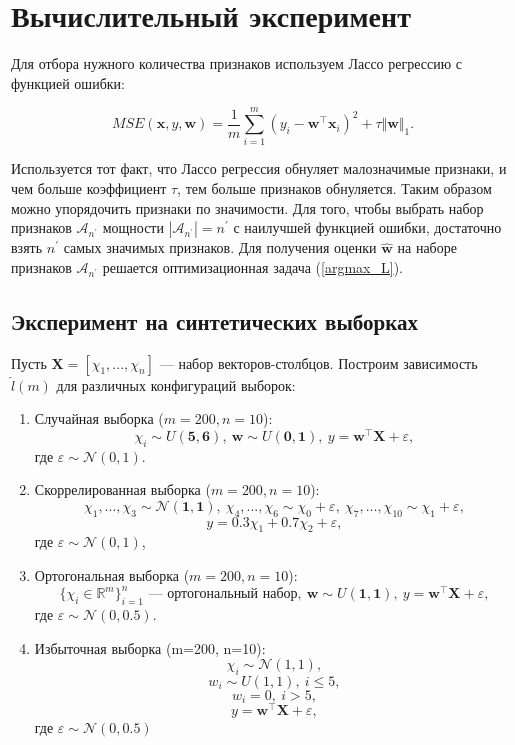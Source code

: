 \documentclass[12pt, a4paper]{scrartcl}
\theoremstyle{plain}
\theoremstyle{definition}
\begin{document}
\newpage
\section{Вычислительный эксперимент}

Для отбора нужного количества признаков используем Лассо регрессию с функцией ошибки:

\begin{equation}\label{MSE_lasso}
MSE(\mathbf{x}, y, \textbf{w}) = \frac{1}{m}\sum\limits_{i=1}^{m}(y_i - \textbf{w}^{\top}\mathbf{x}_i )^2 + \tau \Vert \mathbf{w}\Vert_1.
\end{equation}

Используется тот факт, что Лассо регрессия обнуляет малозначимые признаки, и чем больше коэффициент $\tau$, тем больше признаков обнуляется. Таким образом можно упорядочить признаки по значимости. Для того, чтобы выбрать набор признаков $\mathcal{A}_{n^{\prime}}$ мощности $|\mathcal{A}_{n^{\prime}}| = n^{\prime}$ с наилучшей функцией ошибки, достаточно взять $n^{\prime}$ самых значимых признаков.  Для получения оценки $\hat{\mathbf{w}}$ на наборе признаков $\mathcal{A}_{n^{\prime}}$ решается оптимизационная задача (\ref{argmax_L}).

\subsection{Эксперимент на синтетических выборках}

Пусть $\mathbf{X} = [\chi_1, ..., \chi_n]$ --- набор векторов-столбцов. Построим зависимость $\hat{l}(m)$ для различных конфигураций выборок:

\begin{enumerate}
	\item Случайная выборка ($m = 200, n = 10$): 
$$ 
\chi_i \sim U(\mathbf{5}, \mathbf{6}), ~ \mathbf{w} \sim U(\mathbf{0}, \mathbf{1}), ~ y = \mathbf{w}^{\top}\mathbf{X} + \varepsilon,
$$
где $\varepsilon \sim \mathcal{N}(0, 1)$.
	\item Скоррелированная выборка ($m = 200, n = 10$):
$$
\chi_1, ..., \chi_3 \sim \mathcal{N}(\mathbf{1}, \mathbf{1}),~ \chi_4, ..., \chi_6 \sim \chi_0 + \varepsilon, ~\chi_7, ..., \chi_{10} \sim \chi_1 + \varepsilon,
$$
$$
	y = 0.3\chi_1 + 0.7\chi_2 + \varepsilon,
$$
где $\varepsilon \sim \mathcal{N}(0, 1)$,
	\item Ортогональная выборка ($m = 200, n = 10$):
$$
	\{\chi_i \in \mathbb{R}^{m}\}_{i=1}^{n}  \text{ --- ортогональный набор}, ~\mathbf{w} \sim U(\mathbf{1}, \mathbf{1}), ~y = \mathbf{w}^{\top}\mathbf{X} + \varepsilon,
$$
где $\varepsilon \sim \mathcal{N}(0, 0.5)$.
	\item Избыточная выборка (m=200, n=10):
$$
	\chi_i \sim \mathcal{N}(1, 1), 
$$
$$
	w_i \sim U(1, 1), ~i \leq 5, 
$$
$$
	w_i = 0, ~i > 5,
$$
$$
	y = \mathbf{w}^{\top}\mathbf{X} + \varepsilon,
$$
где $\varepsilon \sim \mathcal{N}(0, 0.5)$
\end{enumerate}
\end{document}

